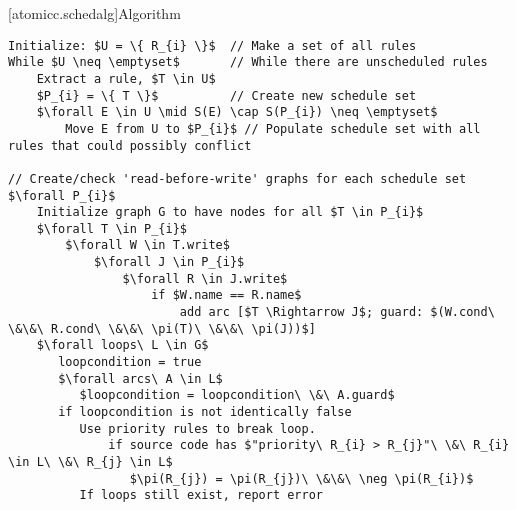 [atomicc.schedalg]{Algorithm}

\begin{lstlisting}[mathescape=true]
Initialize: $U = \{ R_{i} \}$  // Make a set of all rules
While $U \neq \emptyset$       // While there are unscheduled rules
    Extract a rule, $T \in U$
    $P_{i} = \{ T \}$          // Create new schedule set
    $\forall E \in U \mid S(E) \cap S(P_{i}) \neq \emptyset$
        Move E from U to $P_{i}$ // Populate schedule set with all rules that could possibly conflict

// Create/check 'read-before-write' graphs for each schedule set
$\forall P_{i}$
    Initialize graph G to have nodes for all $T \in P_{i}$
    $\forall T \in P_{i}$
        $\forall W \in T.write$
            $\forall J \in P_{i}$
                $\forall R \in J.write$
                    if $W.name == R.name$
                        add arc [$T \Rightarrow J$; guard: $(W.cond\ \&\&\ R.cond\ \&\&\ \pi(T)\ \&\&\ \pi(J))$]
    $\forall loops\ L \in G$
       loopcondition = true
       $\forall arcs\ A \in L$ 
          $loopcondition = loopcondition\ \&\ A.guard$
       if loopcondition is not identically false
          Use priority rules to break loop.
              if source code has $"priority\ R_{i} > R_{j}"\ \&\ R_{i} \in L\ \&\ R_{j} \in L$
                 $\pi(R_{j}) = \pi(R_{j})\ \&\&\ \neg \pi(R_{i})$
          If loops still exist, report error
\end{lstlisting}

